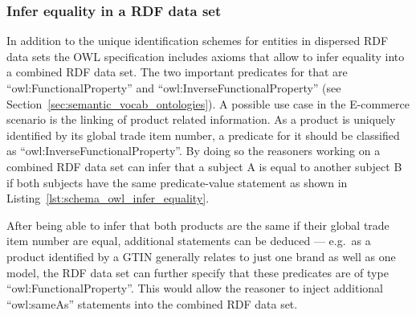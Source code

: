 \subsubsection{Infer equality in a \gls{RDF} data set}
\label{subsub:info_unique_infer}

In addition to the unique identification schemes for entities in dispersed \gls{RDF} data sets the \gls{OWL} specification includes axioms that allow to infer equality into a combined \gls{RDF} data set. The two important predicates for that are ``owl:FunctionalProperty'' and ``owl:InverseFunctionalProperty'' (see Section~\ref{sec:semantic_vocab_ontologies}). A possible use case in the \gls{E-commerce} scenario is the linking of product related information. As a product is uniquely identified by its global trade item number, a predicate for it should be classified as ``owl:InverseFunctionalProperty''. By doing so the reasoners working on a combined \gls{RDF} data set can infer that a subject A is equal to another subject B if both subjects have the same predicate-value statement as shown in Listing~\ref{lst:schema_owl_infer_equality}. \@


After being able to infer that both products are the same if their global trade item number are equal, additional statements can be deduced --- e.g.\ as a product identified by a \gls{GTIN} generally relates to just one brand as well as one model, the \gls{RDF} data set can further specify that these predicates are of type ``owl:FunctionalProperty''. This would allow the reasoner to inject additional ``owl:sameAs'' statements into the combined \gls{RDF} data set.


